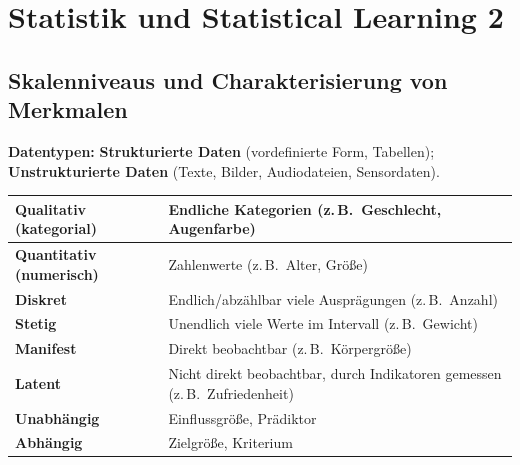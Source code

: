 \section{Statistik und Statistical Learning 2}

\subsection{Skalenniveaus und Charakterisierung von Merkmalen}

\textbf{Datentypen:} \textbf{Strukturierte Daten} (vordefinierte Form, Tabellen); \textbf{Unstrukturierte Daten} (Texte, Bilder, Audiodateien, Sensordaten).


\begin{center}
    \small
    \begin{tabular}{|l|l|}
        \hline
        \textbf{Qualitativ (kategorial)} & Endliche Kategorien (z.\,B.\ Geschlecht, Augenfarbe)                         \\
        \hline
        \textbf{Quantitativ (numerisch)} & Zahlenwerte (z.\,B.\ Alter, Größe)                                          \\
        \hline
        \textbf{Diskret}                 & Endlich/abzählbar viele Ausprägungen (z.\,B.\ Anzahl)                        \\
        \hline
        \textbf{Stetig}                  & Unendlich viele Werte im Intervall (z.\,B.\ Gewicht)                         \\
        \hline
        \textbf{Manifest}                & Direkt beobachtbar (z.\,B.\ Körpergröße)                                      \\
        \hline
        \textbf{Latent}                  & Nicht direkt beobachtbar, durch Indikatoren gemessen (z.\,B.\ Zufriedenheit) \\
        \hline
        \textbf{Unabhängig}              & Einflussgröße, Prädiktor                                                     \\
        \hline
        \textbf{Abhängig}                & Zielgröße, Kriterium                                                          \\
        \hline
    \end{tabular}
\end{center}

